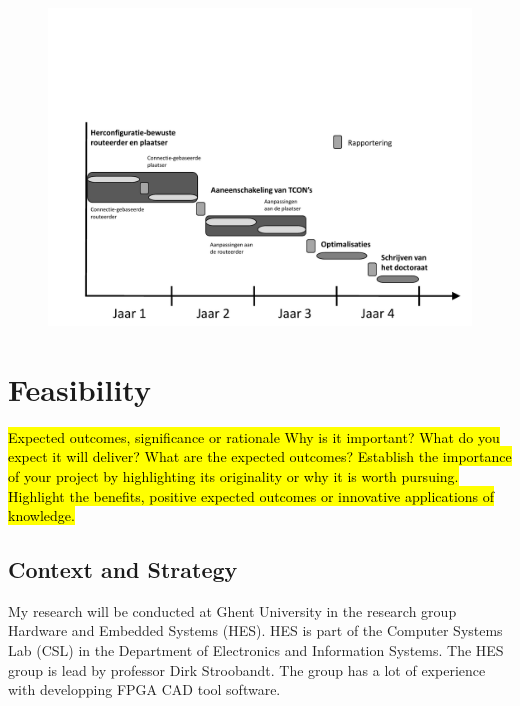 \documentclass[a4paper,oneside,12pt]{article}
\begin{document}
\begin{figure}[ht]
\centering
\includegraphics[width = \textwidth,trim = 0mm 0mm 0mm 70mm, clip]{tijdschema.pdf}
\end{figure}

\newpage
\section{Feasibility}
\hl{Expected outcomes, significance or rationale
Why is it important? 
What do you expect it will deliver? 
What are the expected outcomes? 
Establish the importance of your project by highlighting its originality or why it is worth pursuing. Highlight the benefits, positive expected outcomes or innovative applications of knowledge.}


\subsection{Context and Strategy}\label{context}
My research will be conducted at Ghent University in the research group Hardware and Embedded Systems (HES). HES is part of the Computer Systems Lab (CSL) in the Department of Electronics and Information Systems. The HES group is lead by professor Dirk Stroobandt. The group has a lot of experience with developping FPGA CAD tool software.



\newpage

\end{document}
